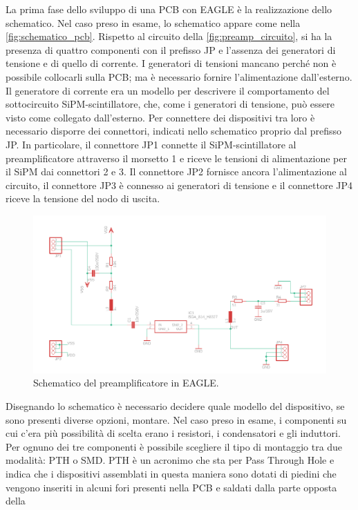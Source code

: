 La prima fase dello sviluppo di una PCB con EAGLE è la realizzazione dello schematico. Nel caso preso in esame, lo schematico appare come nella
\autoref*{fig:schematico_pcb}. Rispetto al circuito della \autoref*{fig:preamp_circuito}, si ha la presenza di quattro componenti con il 
prefisso JP e l'assenza dei generatori di tensione e di quello di corrente. I generatori di tensioni mancano perché non è possibile collocarli sulla
PCB; ma è necessario fornire l'alimentazione dall'esterno. Il generatore di corrente era un modello per descrivere
il comportamento del sottocircuito SiPM-scintillatore, che, come i generatori di tensione, può essere visto come collegato dall'esterno. Per connettere
dei dispositivi tra loro è necessario disporre dei connettori, indicati nello schematico proprio dal prefisso JP. In particolare, il connettore
JP1 connette il SiPM-scintillatore al preamplificatore attraverso il morsetto 1 e riceve le tensioni di alimentazione per il SiPM dai connettori
2 e 3. Il connettore JP2 fornisce ancora l'alimentazione al circuito, il connettore JP3 è connesso ai generatori di tensione e il connettore JP4
riceve la tensione del nodo di uscita.
\begin{figure}[h!]
    \centering
    \includegraphics[width=\linewidth]{img/schematico_pcb.png}
    \caption{Schematico del preamplificatore in EAGLE.}
    \label{fig:schematico_pcb}
\end{figure}
Disegnando lo schematico è necessario decidere quale modello del dispositivo, se sono presenti diverse opzioni, montare. Nel caso preso in esame, i componenti su
cui c'era più possibilità di scelta erano i resistori, i condensatori e gli induttori. Per ognuno dei tre componenti  è possibile scegliere il tipo di 
montaggio tra due modalità: PTH o SMD. PTH è un acronimo che sta per Pass Through Hole e indica che i dispositivi assemblati in questa 
maniera sono dotati di piedini che vengono inseriti in alcuni fori presenti nella PCB e saldati dalla parte opposta della 
